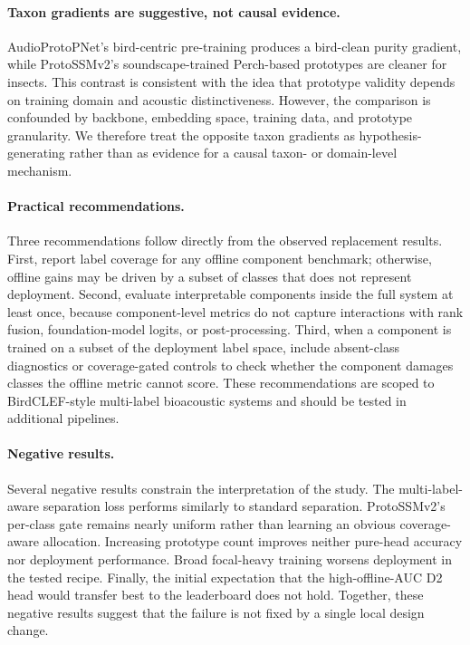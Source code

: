 \documentclass{ceurart}
\begin{document}
\paragraph{Taxon gradients are suggestive, not causal evidence.}
AudioProtoPNet's bird-centric pre-training produces a bird-clean purity gradient, while ProtoSSMv2's soundscape-trained Perch-based prototypes are cleaner for insects.
This contrast is consistent with the idea that prototype validity depends on training domain and acoustic distinctiveness.
However, the comparison is confounded by backbone, embedding space, training data, and prototype granularity.
We therefore treat the opposite taxon gradients as hypothesis-generating rather than as evidence for a causal taxon- or domain-level mechanism.

\paragraph{Practical recommendations.}
Three recommendations follow directly from the observed replacement results.
First, report label coverage for any offline component benchmark; otherwise, offline gains may be driven by a subset of classes that does not represent deployment.
Second, evaluate interpretable components inside the full system at least once, because component-level metrics do not capture interactions with rank fusion, foundation-model logits, or post-processing.
Third, when a component is trained on a subset of the deployment label space, include absent-class diagnostics or coverage-gated controls to check whether the component damages classes the offline metric cannot score.
These recommendations are scoped to BirdCLEF-style multi-label bioacoustic systems and should be tested in additional pipelines.

\paragraph{Negative results.}
Several negative results constrain the interpretation of the study.
The multi-label-aware separation loss performs similarly to standard separation.
ProtoSSMv2's per-class gate remains nearly uniform rather than learning an obvious coverage-aware allocation.
Increasing prototype count improves neither pure-head accuracy nor deployment performance.
Broad focal-heavy training worsens deployment in the tested recipe.
Finally, the initial expectation that the high-offline-AUC D2 head would transfer best to the leaderboard does not hold.
Together, these negative results suggest that the failure is not fixed by a single local design change.
\end{document}
